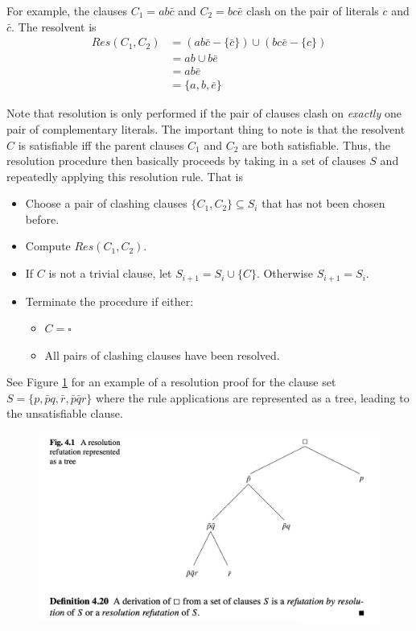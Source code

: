 \documentclass[10pt]{article}
\begin{document}
For example, the clauses $C_1=ab\bar{c}$ and $C_2=bc\bar{e}$ clash on the pair of literals $c$ and $\bar{c}$. The resolvent is
\begin{align*}
    Res(C_1,C_2) &= (ab\bar{c} - \{\bar{c}\}) \cup (bc\bar{e} - \{c\})\\
    &=ab \cup b\bar{e}\\
    &=ab\bar{e}\\
    &=\{a,b,\bar{e}\}
\end{align*}

Note that resolution is only performed if the pair of clauses clash on \textit{exactly} one pair of complementary literals. The important thing to note is that the resolvent $C$ is satisfiable iff the parent clauses $C_1$ and $C_2$ are both satisfiable. Thus, the resolution procedure then basically proceeds by taking in a set of clauses $S$ and repeatedly applying this resolution rule. That is
\begin{itemize}
    \item Choose a pair of clashing clauses $\{C_1,C_2\} \subseteq S_i$ that has not been chosen before.
    \item Compute $Res(C_1,C_2)$.
    \item If $C$ is not a trivial clause, let $S_{i+1}=S_i \cup \{C\}$. Otherwise $S_{i+1}=S_i$.
    \item Terminate the procedure if either:
    \begin{itemize}
        \item $C=\square$
        \item All pairs of clashing clauses have been resolved.
    \end{itemize}
\end{itemize}
See Figure \ref{fig:resolution-refutation-tree} for an example of a resolution proof for the clause set $S=\{p,\bar{p}q, \bar{r}, \bar{p} \bar{q}r\}$ where the rule applications are represented as a tree, leading to the unsatisfiable clause.
\begin{figure}
    \centering
    \includegraphics[scale=0.25]{figures/refutation-example.png}
    \label{fig:resolution-refutation-tree}
\end{figure}
\end{document}
